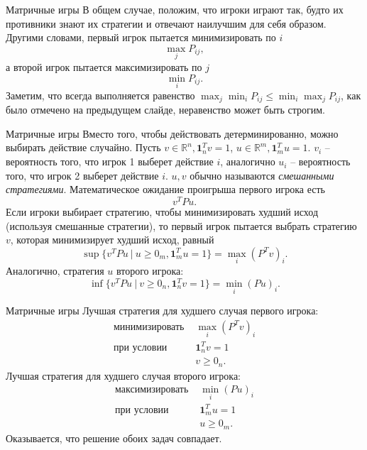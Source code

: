 \documentclass[10pt]{beamer}
\begin{document}
\begin{frame}{Матричные игры}
В общем случае, положим, что игроки играют так, будто их противники знают их стратегии и отвечают наилучшим для себя образом. Другими словами, первый игрок пытается минимизировать по $i$
$$
\max_jP_{ij},
$$
а второй игрок пытается максимизировать по $j$
$$
\min_iP_{ij}.
$$
Заметим, что всегда выполняется равенство $\max_j\min_iP_{ij}\leq \min_i\max_jP_{ij}$, как было отмечено на предыдущем слайде, неравенство может быть строгим.
\end{frame}

\begin{frame}{Матричные игры}
Вместо того, чтобы действовать детерминированно, можно выбирать действие случайно. Пусть $v\in\mathbb{R}^n, \mathbf{1}^T_nv=1$, $u\in\mathbb{R}^m, \mathbf{1}^T_mu=1$. $v_i$ -- вероятность того, что игрок 1 выберет действие $i$, аналогично $u_i$ -- вероятность того, что игрок 2 выберет действие $i$. $u, v$ обычно называются \textit{смешанными стратегиями}. Математическое ожидание проигрыша первого игрока есть
$$
v^TPu.
$$
Если игроки выбирает стратегию, чтобы минимизировать худший исход (используя смешанные стратегии), то первый игрок пытается выбрать стратегию $v$, которая минимизирует худший исход, равный
$$
\sup \{v^TPu~|~u\geq 0_m, \mathbf{1}_m^Tu=1\}=\max_i(P^Tv)_i.
$$
Аналогично, стратегия $u$ второго игрока:
$$
\inf \{v^TPu~|~v\geq 0_n, \mathbf{1}_n^Tv=1\}=\min_i(Pu)_i.
$$
\end{frame}

\begin{frame}{Матричные игры}
Лучшая стратегия для худшего случая первого игрока:
$$
\begin{array}{ll}
\mbox{минимизировать } & \max_i(P^Tv)_i\\
\mbox{при условии }    & \mathbf{1}^T_nv=1\\
 & v\geq 0_n.
\end{array}
$$
Лучшая стратегия для худшего случая второго игрока:
$$
\begin{array}{ll}
\mbox{максимизировать } & \min_i(Pu)_i\\
\mbox{при условии }    & \mathbf{1}^T_mu=1\\
 & u\geq 0_m.
\end{array}
$$
Оказывается, что решение обоих задач совпадает. 
\end{frame}
\end{document}

